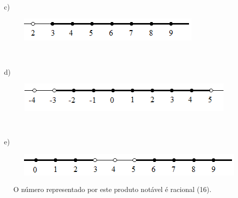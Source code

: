\begin{respostas}{5}
~~

 c)

\begin{figure}[H]
	\begin{Center}
		\includegraphics[width=3.49in,height=0.46in]{capitulos/conjuntos_numericos/media/image19.png}
	\end{Center}
\end{figure}

~~

d)

\begin{figure}[H]
	\begin{Center}
		\includegraphics[width=4.17in,height=0.56in]{capitulos/conjuntos_numericos/media/image20.png}
	\end{Center}
\end{figure}


~~

 e)

\begin{figure}[H]
	\begin{Center}
		\includegraphics[width=4.38in,height=0.45in]{capitulos/conjuntos_numericos/media/image21.png}
	\end{Center}
\end{figure}

~~
\ansitem{} O número representado por este produto notável é racional (16).

\end{respostas}